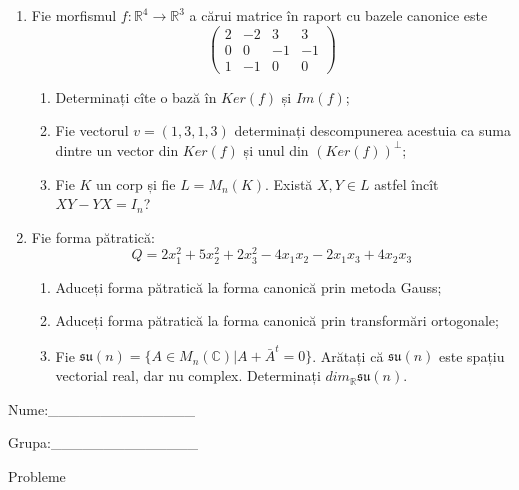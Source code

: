 \documentclass{article}
\begin{document}
\begin{enumerate}
 \item Fie morfismul $f:\mathbb{R}^4 \to \mathbb{R}^3$ a cărui matrice în raport cu bazele canonice este
$$\begin{pmatrix}
2&-2&3&3\\
0&0&-1&-1\\
1&-1&0&0
\end{pmatrix}$$

\begin{enumerate}
\item Determinați cîte o bază în $Ker(f)$ și $Im(f)$;
\item Fie vectorul $v=(1,3,1,3)$ determinați descompunerea acestuia ca suma dintre un vector din $Ker(f)$ și unul din $(Ker(f))^\perp$;
\item Fie $K$ un corp și fie $L=M_n(K)$. Există $X,Y \in L$ astfel încît $XY-YX=I_n$?  
\end{enumerate}
\item Fie forma pătratică:
$$Q= 2x_1^2+5x_2^2+2x_3^2-4x_1x_2-2x_1x_3+4x_2x_3$$

\begin{enumerate}
\item Aduceți forma pătratică la forma canonică prin metoda Gauss;
\item Aduceți forma pătratică la forma canonică prin transformări ortogonale;
\item Fie $\mathfrak{su}(n)=\{ A \in M_n(\mathbb{C}) | A+\bar{A}^t=0\}$. Arătați că $\mathfrak{su}(n)$ este spațiu vectorial real, dar nu complex.
Determinați $dim_{\mathbb{R}}\mathfrak{su}(n)$.
\end{enumerate}
\end{enumerate}
\newpage
\begin{flushright}
Nume:\_\_\_\_\_\_\_\_\_\_\_\_\_\_
 
 
Grupa:\_\_\_\_\_\_\_\_\_\_\_\_\_\_
\end{flushright}
\begin{center}
\vspace{2cm}
{\Large Probleme}
\vspace{2cm}
\end{center}
\end{document}
